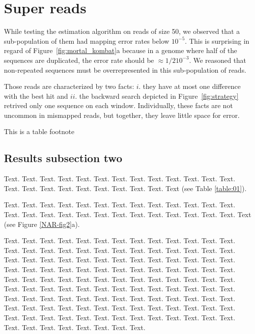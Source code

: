 \documentclass[a4,center,fleqn]{NAR}
\begin{document}
\section{Super reads}

While testing the estimation algorithm on reads of size 50, we observed
that a sub-population of them had mapping error rates below $10^{-5}$.
This is surprising in regard of Figure~\ref{fig:mortal_kombat}a because in
a genome where half of the sequences are duplicated, the error rate should
be $\approx 1/2 10^{-3}$. We reasoned that non-repeated sequences must be
overrepresented in this sub-population of reads.

Those reads are characterized by two facts: $i.$ they have at most one
difference with the best hit and $ii.$ the backward search depicted in
Figure~\ref{fig:strategy} retrived only one sequence on each window.
Individually, these facts are not uncommon in mismapped reads, but
together, they leave little space for error.



\begin{table}[b]
{This is a table footnote}
\end{table}


\subsection{Results subsection two}

Text.  Text. Text. Text. Text. Text. Text. Text. Text. Text. Text.
Text. Text. Text. Text. Text. Text. Text. Text. Text. Text. Text.
Text (see Table \ref{table:01}).

Text. Text. Text. Text. Text. Text.
Text. Text. Text. Text. Text. Text. Text. Text. Text. Text. Text.
Text. Text. Text. Text. Text. Text. Text. Text. Text.
Text (see Figure \ref{NAR-fig2}a).

Text. Text. Text. Text. Text.
Text. Text. Text. Text. Text. Text. Text. Text. Text. Text. Text.
Text. Text. Text. Text. Text. Text. Text. Text. Text. Text. Text.
Text. Text. Text. Text. Text. Text. Text. Text. Text. Text. Text.
Text. Text. Text. Text. Text. Text. Text. Text. Text. Text. Text.
Text. Text. Text. Text. Text. Text. Text. Text. Text. Text. Text.
Text. Text. Text. Text. Text. Text. Text. Text. Text. Text. Text.
Text. Text. Text. Text. Text. Text. Text. Text. Text. Text. Text.
Text. Text. Text. Text. Text. Text. Text. Text. Text. Text. Text.
Text. Text. Text. Text. Text. Text. Text. Text. Text. Text. Text.
Text. Text. Text. Text. Text. Text. Text. Text. Text. Text. Text.
Text. Text. Text. Text. Text. Text. Text. Text. Text. Text.
\end{document}
